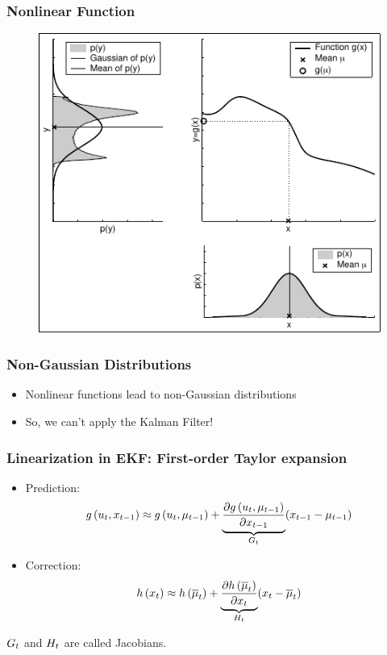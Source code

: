 \begin{frame}
    \frametitle{Nonlinear Function}
    
    \begin{figure}[!h]
        \includegraphics[width=0.5\columnwidth]{./images/nonlinear_transformation_of_a_gaussian.pdf}
    \end{figure}
\end{frame}
    
\begin{frame}
    \frametitle{Non-Gaussian Distributions}
    
    
    \begin{itemize}
        \item Nonlinear functions lead to non-Gaussian distributions
        \item So, we can't apply the Kalman Filter!
    \end{itemize}
    
\end{frame}
    
\begin{frame}
    \frametitle{Linearization in EKF: First-order Taylor expansion}
    
    
    \begin{itemize}
        \item Prediction:
        \begin{equation*}
        g\left( u_{t}, x _{t-1} \right) \approx g\left( u_{t}, \mu _{t-1} \right) + \underbrace{\dfrac{\partial g\left( u_{t}, \mu _{t-1} \right)}{\partial x _{t-1}}}_{G_{t}} (x_{t-1} - \mu_{t-1})
        \end{equation*}
        \item Correction:
        \begin{equation*}
        h\left( x_{t} \right) \approx h\left( \overline{\mu}_{t} \right) + \underbrace{\dfrac{\partial h\left( \overline{\mu}_{t} \right)}{\partial x_{t}}}_{H_{t}} (x_{t} - \overline{\mu}_{t})
        \end{equation*}
    \end{itemize}

    $G_{t}$ and $H_{t}$ are called Jacobians.
\end{frame}
    

